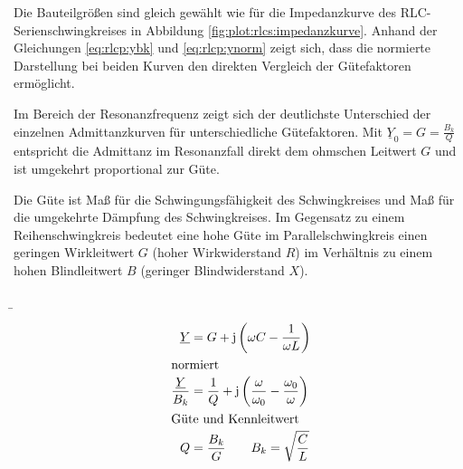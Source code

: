 \begin{frame}
{    Die Bauteilgrößen sind gleich gewählt wie für die Impedanzkurve des RLC-Serienschwingkreises in Abbildung \ref{fig:plot:rlcs:impedanzkurve}.
    Anhand der Gleichungen \ref{eq:rlcp:ybk} und \ref{eq:rlcp:ynorm} zeigt sich, dass die normierte Darstellung bei beiden Kurven den direkten Vergleich
    der Gütefaktoren ermöglicht. 

    Im Bereich der Resonanzfrequenz zeigt sich der deutlichste Unterschied der einzelnen Admittanzkurven für unterschiedliche Gütefaktoren.
    Mit $\underline{Y}_0 = G = \frac{B_k}{Q}$ entspricht die Admittanz im Resonanzfall direkt dem ohmschen Leitwert $G$ 
    und ist umgekehrt proportional zur Güte.
        
    Die Güte ist Maß für die Schwingungsfähigkeit des Schwingkreises und Maß für die umgekehrte Dämpfung des Schwingkreises.
    Im Gegensatz zu einem Reihenschwingkreis bedeutet eine hohe Güte im Parallelschwingkreis einen 
    geringen Wirkleitwert $G$ (hoher Wirkwiderstand $R$) im Verhältnis zu einem
    hohen Blindleitwert $B$ (geringer Blindwiderstand $X$).
    }%
    \b{%
    \begin{minipage}{0.3\textwidth}%
    \begin{align*}
        \underline{Y} &= G + \mathrm{j}\left(\omega C - \frac{1}{\omega L}\right)\\
            \intertext{normiert}
        \frac{\underline{Y}}{B_k} &= \frac{1}{Q} + \mathrm{j}\left(\frac{\omega}{\omega_0} - \frac{\omega_0}{\omega}\right)\\
            \intertext{Güte und Kennleitwert}
        Q &= \frac{B_k}{G} \qquad B_k = \sqrt{\frac{C}{L}}
    \end{align*}
    \end{minipage}\hfill%
    \begin{minipage}{0.65\textwidth}\centering
    \end{minipage}
    }
    \end{frame}    


